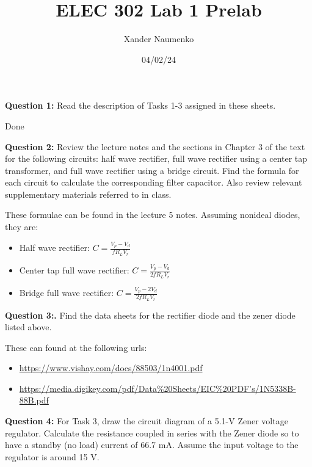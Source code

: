 \documentclass[letterpaper, reqno,11pt]{article}
\begin{document}
\title{ELEC 302 Lab 1 Prelab}
\date{04/02/24}
\author{Xander Naumenko}
\maketitle

{\medskip\noindent\bf Question 1: } Read the description of Tasks 1-3 assigned in these sheets.

Done

{\medskip\noindent\bf Question 2:} Review the lecture notes and the sections in Chapter 3 of the text for the following circuits: half wave rectifier, full wave rectifier using a center tap transformer, and full wave rectifier using a bridge circuit. Find the formula for each circuit to calculate the corresponding filter capacitor. Also review relevant supplementary materials referred to in class.

These formulae can be found in the lecture 5 notes. Assuming nonideal diodes, they are:
\begin{itemize}
    \item {Half wave rectifier: $C=\frac{V_p-V_d}{fR_LV_r}$}
    \item {Center tap full wave rectifier: $C=\frac{V_p-V_d}{2fR_LV_r}$}
    \item {Bridge full wave rectifier: $C=\frac{V_p-2V_d}{2fR_LV_r}$}
\end{itemize}

{\medskip\noindent\bf Question 3:.} Find the data sheets for the rectifier diode and the zener diode listed above.

These can found at the following urls:
\begin{itemize}
    \item{\href{https://www.vishay.com/docs/88503/1n4001.pdf}{https://www.vishay.com/docs/88503/1n4001.pdf}}
    \item{\href{https://media.digikey.com/pdf/Data%20Sheets/EIC%20PDF's/1N5338B-88B.pdf}{https://media.digikey.com/pdf/Data\%20Sheets/EIC\%20PDF's/1N5338B-88B.pdf}}
\end{itemize}

{\medskip\noindent\bf Question 4:} For Task 3, draw the circuit diagram of a 5.1-V Zener voltage regulator. Calculate the resistance coupled in series with the Zener diode so to have a standby (no load) current of 66.7 mA. Assume the input voltage to the regulator is around 15 V.
\end{document}
